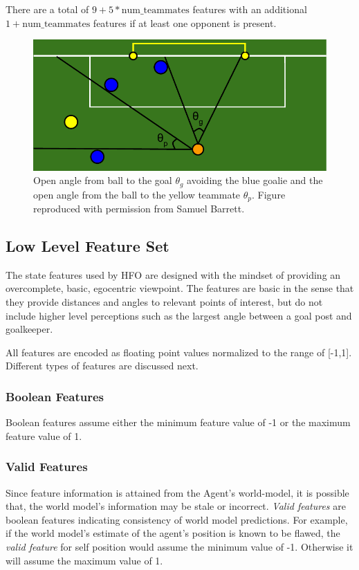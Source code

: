 \documentclass[12pt]{article}
\begin{document}
There are a total of $9 + 5*\textrm{num\_teammates}$ features with an
additional $1 + \textrm{num\_teammates}$ features if at least one
opponent is present.

\begin{figure}[htp]
  \centering
  \includegraphics[width=.75\textwidth]{figures/openAngle}
  \caption{Open angle from ball to the goal $\theta_g$ avoiding the
    blue goalie and the open angle from the ball to the yellow
    teammate $\theta_p$. Figure reproduced with permission from Samuel
    Barrett.}
  \label{fig:openAngle}
\end{figure}

\subsection {Low Level Feature Set}
The state features used by HFO are designed with the mindset of
providing an overcomplete, basic, egocentric viewpoint. The features
are basic in the sense that they provide distances and angles to
relevant points of interest, but do not include higher level
perceptions such as the largest angle between a goal post and
goalkeeper.

All features are encoded as floating point values normalized to the
range of [-1,1]. Different types of features are discussed next.

\subsubsection{Boolean Features}

Boolean features assume either the minimum feature value of -1 or the
maximum feature value of 1.

\subsubsection{Valid Features}

Since feature information is attained from the Agent's world-model, it
is possible that, the world model's information may be stale or
incorrect. \textit{Valid features} are boolean features indicating
consistency of world model predictions. For example, if the world
model's estimate of the agent's position is known to be flawed, the
\textit{valid feature} for self position would assume the minimum
value of -1. Otherwise it will assume the maximum value of 1.
\end{document}

